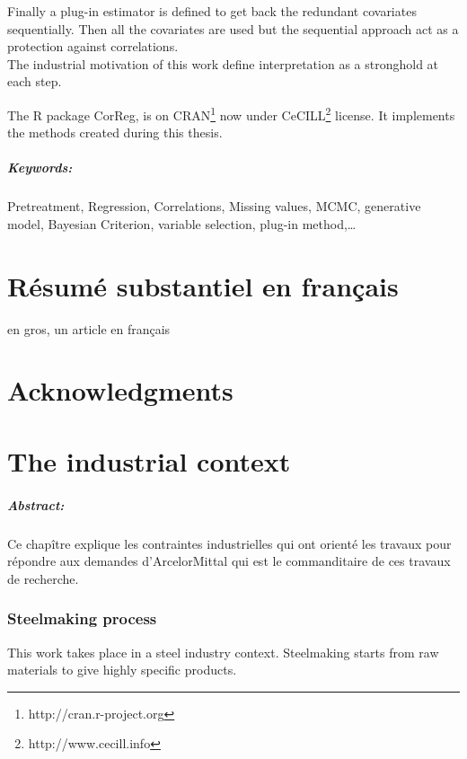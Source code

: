 \documentclass[12pt,a4paper]{report}
\begin{document}
	Finally a plug-in estimator is defined to get back the redundant covariates sequentially. Then all the covariates are used but the sequential approach act as a protection against correlations.
\\

	The industrial motivation of this work define interpretation as a stronghold at each step. 	
	
	The R package CorReg, is on CRAN\footnote{http://cran.r-project.org} now under CeCILL\footnote{http://www.cecill.info} license. It implements the methods created during this thesis.
	
	 	
\paragraph{Keywords:} Pretreatment, Regression, Correlations, Missing values, MCMC, generative model, Bayesian Criterion, variable selection, plug-in method,\dots
\chapter*{Résumé substantiel en français}
	en gros, un article en français
\chapter*{Acknowledgments}






\tableofcontents

\chapter{The industrial context}
	\paragraph{Abstract:} Ce chapître explique les contraintes industrielles qui ont orienté les travaux pour répondre aux demandes d'ArcelorMittal qui est le commanditaire de ces travaux de recherche.
\subsection{Steelmaking process}
	This work takes place in a steel industry context.
	Steelmaking starts from raw materials to give highly specific products.
	
\end{document}
